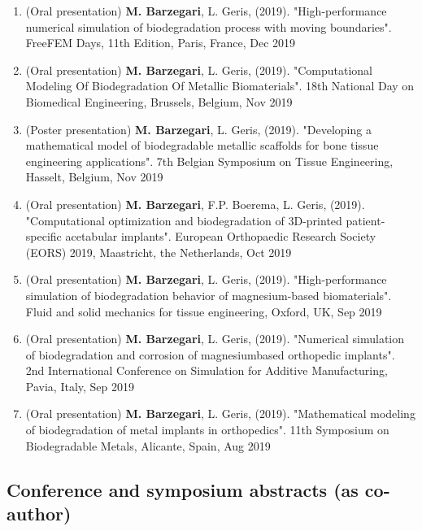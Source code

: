 \documentclass{cv}
\begin{document}
\begin{enumerate}
\item
(Oral presentation) 
\textbf{M. Barzegari}, L. Geris, (2019). "High-performance numerical simulation of biodegradation process with moving boundaries". FreeFEM Days, 11th Edition, Paris, France, Dec 2019
\item
(Oral presentation) 
\textbf{M. Barzegari}, L. Geris, (2019). "Computational Modeling Of Biodegradation Of Metallic Biomaterials". 18th National Day on Biomedical Engineering, Brussels, Belgium, Nov 2019
\item
(Poster presentation) 
\textbf{M. Barzegari}, L. Geris, (2019). "Developing a mathematical model of biodegradable metallic scaffolds for bone tissue engineering applications". 7th Belgian Symposium on Tissue Engineering, Hasselt, Belgium, Nov 2019
\item
(Oral presentation) 
\textbf{M. Barzegari}, F.P. Boerema, L. Geris, (2019). "Computational optimization and biodegradation of 3D-printed patient-specific acetabular implants". European Orthopaedic Research Society (EORS) 2019, Maastricht, the Netherlands, Oct 2019
\item
(Oral presentation) 
\textbf{M. Barzegari}, L. Geris, (2019). "High-performance simulation of biodegradation behavior of magnesium-based biomaterials". Fluid and solid mechanics for tissue engineering, Oxford, UK, Sep 2019
\item
(Oral presentation) 
\textbf{M. Barzegari}, L. Geris, (2019). "Numerical simulation of biodegradation and corrosion of magnesiumbased orthopedic implants". 2nd International Conference on Simulation for Additive Manufacturing, Pavia, Italy, Sep 2019
\item
(Oral presentation) 
\textbf{M. Barzegari}, L. Geris, (2019). "Mathematical modeling of biodegradation of metal implants in orthopedics". 11th Symposium on Biodegradable Metals, Alicante, Spain, Aug 2019
\end{enumerate}

\subsection{Conference and symposium abstracts (as co-author)}
\end{document}
